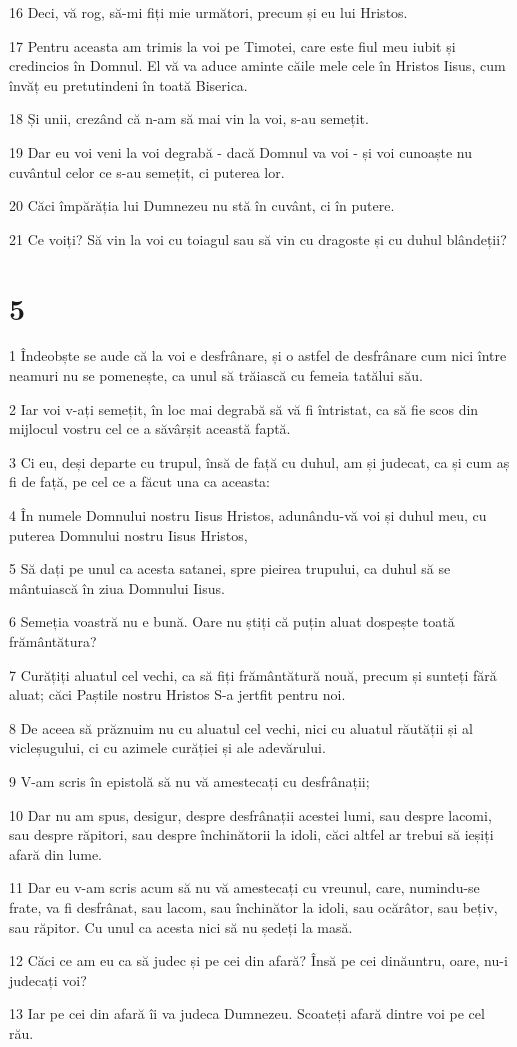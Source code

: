 \par 16 Deci, vă rog, să-mi fiți mie următori, precum și eu lui Hristos.
\par 17 Pentru aceasta am trimis la voi pe Timotei, care este fiul meu iubit și credincios în Domnul. El vă va aduce aminte căile mele cele în Hristos Iisus, cum învăț eu pretutindeni în toată Biserica.
\par 18 Și unii, crezând că n-am să mai vin la voi, s-au semețit.
\par 19 Dar eu voi veni la voi degrabă - dacă Domnul va voi - și voi cunoaște nu cuvântul celor ce s-au semețit, ci puterea lor.
\par 20 Căci împărăția lui Dumnezeu nu stă în cuvânt, ci în putere.
\par 21 Ce voiți? Să vin la voi cu toiagul sau să vin cu dragoste și cu duhul blândeții?

\chapter{5}

\par 1 Îndeobște se aude că la voi e desfrânare, și o astfel de desfrânare cum nici între neamuri nu se pomenește, ca unul să trăiască cu femeia tatălui său.
\par 2 Iar voi v-ați semețit, în loc mai degrabă să vă fi întristat, ca să fie scos din mijlocul vostru cel ce a săvârșit această faptă.
\par 3 Ci eu, deși departe cu trupul, însă de față cu duhul, am și judecat, ca și cum aș fi de față, pe cel ce a făcut una ca aceasta:
\par 4 În numele Domnului nostru Iisus Hristos, adunându-vă voi și duhul meu, cu puterea Domnului nostru Iisus Hristos,
\par 5 Să dați pe unul ca acesta satanei, spre pieirea trupului, ca duhul să se mântuiască în ziua Domnului Iisus.
\par 6 Semeția voastră nu e bună. Oare nu știți că puțin aluat dospește toată frământătura?
\par 7 Curățiți aluatul cel vechi, ca să fiți frământătură nouă, precum și sunteți fără aluat; căci Paștile nostru Hristos S-a jertfit pentru noi.
\par 8 De aceea să prăznuim nu cu aluatul cel vechi, nici cu aluatul răutății și al vicleșugului, ci cu azimele curăției și ale adevărului.
\par 9 V-am scris în epistolă să nu vă amestecați cu desfrânații;
\par 10 Dar nu am spus, desigur, despre desfrânații acestei lumi, sau despre lacomi, sau despre răpitori, sau despre închinătorii la idoli, căci altfel ar trebui să ieșiți afară din lume.
\par 11 Dar eu v-am scris acum să nu vă amestecați cu vreunul, care, numindu-se frate, va fi desfrânat, sau lacom, sau închinător la idoli, sau ocărâtor, sau bețiv, sau răpitor. Cu unul ca acesta nici să nu ședeți la masă.
\par 12 Căci ce am eu ca să judec și pe cei din afară? Însă pe cei dinăuntru, oare, nu-i judecați voi?
\par 13 Iar pe cei din afară îi va judeca Dumnezeu. Scoateți afară dintre voi pe cel rău.

